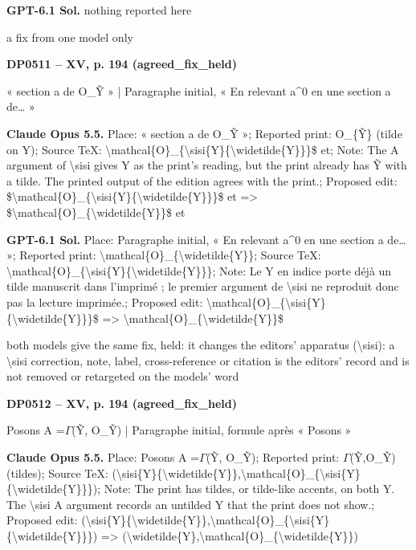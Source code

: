 \textbf{GPT-6.1 Sol.} nothing reported here\par
a fix from one model only\par
\par\noindent\hypertarget{DP0511}{}\textbf{DP0511 -- XV, p. 194 (agreed\_fix\_held)}\par
« section a de O\_Ỹ » | Paragraphe initial, « En relevant a\textasciicircum{}0 en une section a de… »\par
\textbf{Claude Opus 5.5.} Place: « section a de O\_Ỹ »; Reported print: O\_\{Ỹ\} (tilde on Y); Source TeX: \textbackslash{}mathcal\{O\}\_\{\textbackslash{}sisi\{Y\}\{\textbackslash{}widetilde\{Y\}\}\}\$ et; Note: The A argument of \textbackslash{}sisi gives Y as the print's reading, but the print already has Ỹ with a tilde. The printed output of the edition agrees with the print.; Proposed edit: \$\textbackslash{}mathcal\{O\}\_\{\textbackslash{}sisi\{Y\}\{\textbackslash{}widetilde\{Y\}\}\}\$ et =\allowbreak > \$\textbackslash{}mathcal\{O\}\_\{\textbackslash{}widetilde\{Y\}\}\$ et\par
\textbf{GPT-6.1 Sol.} Place: Paragraphe initial, « En relevant a\textasciicircum{}0 en une section a de… »; Reported print: \textbackslash{}mathcal\{O\}\_\{\textbackslash{}widetilde\{Y\}\}; Source TeX: \textbackslash{}mathcal\{O\}\_\{\textbackslash{}sisi\{Y\}\{\textbackslash{}widetilde\{Y\}\}\}; Note: Le Y en indice porte déjà un tilde manuscrit dans l'imprimé ; le premier argument de \textbackslash{}sisi ne reproduit donc pas la lecture imprimée.; Proposed edit: \textbackslash{}mathcal\{O\}\_\{\textbackslash{}sisi\{Y\}\{\textbackslash{}widetilde\{Y\}\}\}\$ =\allowbreak > \textbackslash{}mathcal\{O\}\_\{\textbackslash{}widetilde\{Y\}\}\$\par
both models give the same fix, held: it changes the editors' apparatus (\textbackslash{}sisi): a \textbackslash{}sisi correction, note, label, cross-reference or citation is the editors' record and is not removed or retargeted on the models' word\par
\par\noindent\hypertarget{DP0512}{}\textbf{DP0512 -- XV, p. 194 (agreed\_fix\_held)}\par
Posons A =\allowbreak  \ensuremath{\Gamma}(Ỹ, O\_Ỹ) | Paragraphe initial, formule après « Posons »\par
\textbf{Claude Opus 5.5.} Place: Posons A =\allowbreak  \ensuremath{\Gamma}(Ỹ, O\_Ỹ); Reported print: \ensuremath{\Gamma}(Ỹ,O\_Ỹ) (tildes); Source TeX: (\textbackslash{}sisi\{Y\}\{\textbackslash{}widetilde\{Y\}\},\textbackslash{}mathcal\{O\}\_\{\textbackslash{}sisi\{Y\}\{\textbackslash{}widetilde\{Y\}\}\}); Note: The print has tildes, or tilde-like accents, on both Y. The \textbackslash{}sisi A argument records an untilded Y that the print does not show.; Proposed edit: (\textbackslash{}sisi\{Y\}\{\textbackslash{}widetilde\{Y\}\},\textbackslash{}mathcal\{O\}\_\{\textbackslash{}sisi\{Y\}\{\textbackslash{}widetilde\{Y\}\}\}) =\allowbreak > (\textbackslash{}widetilde\{Y\},\textbackslash{}mathcal\{O\}\_\{\textbackslash{}widetilde\{Y\}\})\par
